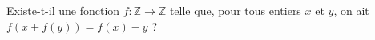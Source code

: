 \documentclass[varwidth]{standalone}
\begin{document}
    Existe-t-il une fonction $f: \mathbb{Z} \to \mathbb{Z}$ telle que, pour tous entiers $x$ et $y$, on ait $f(x + f(y)) = f(x) - y$ ?
\end{document}
